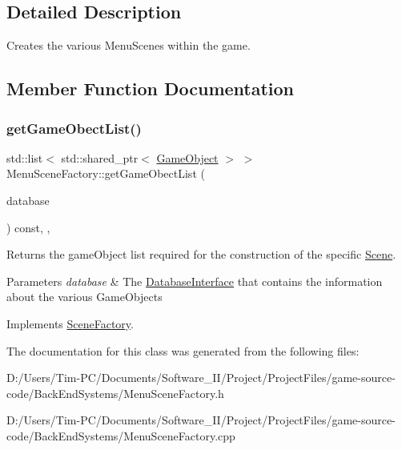 \subsection{Detailed Description}
Creates the various Menu\+Scenes within the game. 

\subsection{Member Function Documentation}
\mbox{\label{class_menu_scene_factory_ade1881c377fa61d1d8fa11c1d30f4ddd}} 
\subsubsection{\texorpdfstring{get\+Game\+Obect\+List()}{getGameObectList()}}
{\footnotesize\ttfamily std\+::list$<$ std\+::shared\+\_\+ptr$<$ \hyperlink{class_game_object}{Game\+Object} $>$ $>$ Menu\+Scene\+Factory\+::get\+Game\+Obect\+List (\begin{DoxyParamCaption}\item[{std\+::shared\+\_\+ptr$<$ \hyperlink{class_database_interface}{Database\+Interface} $>$}]{database }\end{DoxyParamCaption}) const\hspace{0.3cm}{\ttfamily [final]}, {\ttfamily [protected]}, {\ttfamily [virtual]}}



Returns the game\+Object list required for the construction of the specific \hyperlink{class_scene}{Scene}. 


\begin{DoxyParams}{Parameters}
{\em database} & The \hyperlink{class_database_interface}{Database\+Interface} that contains the information about the various Game\+Objects \\
\hline
\end{DoxyParams}


Implements \hyperlink{class_scene_factory_a2c8541230e95df49d2ab39b7c6ecdb78}{Scene\+Factory}.



The documentation for this class was generated from the following files\+:\begin{DoxyCompactItemize}
\item 
D\+:/\+Users/\+Tim-\/\+P\+C/\+Documents/\+Software\+\_\+\+I\+I/\+Project/\+Project\+Files/game-\/source-\/code/\+Back\+End\+Systems/Menu\+Scene\+Factory.\+h\item 
D\+:/\+Users/\+Tim-\/\+P\+C/\+Documents/\+Software\+\_\+\+I\+I/\+Project/\+Project\+Files/game-\/source-\/code/\+Back\+End\+Systems/Menu\+Scene\+Factory.\+cpp\end{DoxyCompactItemize}
